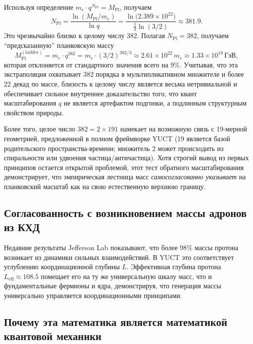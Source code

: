 \documentclass[11pt,a4paper]{article}
\newcommand{\Mpl}{M_{\mathrm{Pl}}}
\begin{document}
	Используя определение $m_e \cdot q^{N_{\mathrm{Pl}}} = \Mpl$, получаем
	\begin{equation}
		N_{\mathrm{Pl}} = \frac{\ln(\Mpl/m_e)}{\ln q}
		= \frac{\ln\!\big(2.389\times10^{22}\big)}{\frac13\ln(3/2)}
		\approx 381.9.
		\label{eq:Npl}
	\end{equation}
	Это чрезвычайно близко к целому числу $382$. Полагая $N_{\mathrm{Pl}} = 382$, получаем ``предсказанную'' планковскую массу
	\begin{equation}
		\Mpl^{\mathrm{(ladder)}} = m_e \cdot q^{382}
		= m_e \cdot (3/2)^{382/3}
		\approx 2.61\times10^{22}\,m_e
		\approx 1.33\times10^{19}\,\text{ГэВ},
		\label{eq:Mpl_ladder}
	\end{equation}
	которая отклоняется от стандартного значения всего на $9\%$. Учитывая, что эта экстраполяция охватывает 382 порядка в мультипликативном множителе и более 22 декад по массе, близость к целому числу является весьма нетривиальной и обеспечивает сильное внутреннее доказательство того, что квант масштабирования $q$ не является артефактом подгонки, а подлинным структурным свойством природы.
	
	Более того, целое число $382 = 2 \times 191$ намекает на возможную связь с 19-мерной геометрией, предложенной в полном фреймворке YUCT (19 является базой родительского пространства-времени; множитель 2 может происходить из спиральности или удвоения частица/античастица). Хотя строгий вывод из первых принципов остается открытой проблемой, этот тест обратного масштабирования демонстрирует, что эмпирическая лестница масс \emph{самосогласованно указывает} на планковский масштаб как на свою естественную верхнюю границу.
	
	\subsection{Согласованность с возникновением массы адронов из КХД}
	
	Недавние результаты Jefferson Lab показывают, что более 98\% массы протона возникает из динамики сильных взаимодействий. В YUCT это соответствует углублению координационной глубины \(L\). Эффективная глубина протона \(L_{\mathrm{eff}} \approx 108.5\) помещает его на ту же универсальную шкалу масс, что и фундаментальные фермионы и ядра, демонстрируя, что генерация массы универсально управляется координационными принципами.
	
	\subsection{Почему эта математика является математикой квантовой механики}
	\label{subsec:QM-as-YUCT}
	
\end{document}
